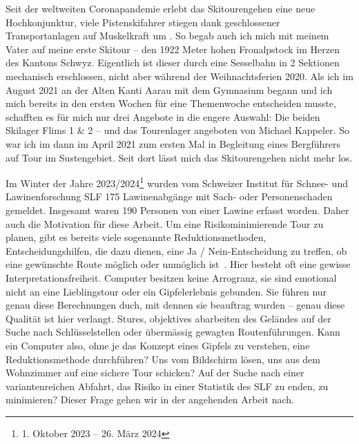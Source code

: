 

Seit der weltweiten Coronapandemie erlebt das Skitourengehen eine neue Hochkonjunktur, viele Pistenskifahrer stiegen dank geschlossener Transportanlagen auf Muskelkraft um \cite{sacCoronaTrend}. So begab auch ich mich mit meinem Vater auf meine erste Skitour – den 1922 Meter hohen Fronalpstock im Herzen des Kantons Schwyz. Eigentlich ist dieser durch eine Sesselbahn in 2 Sektionen mechanisch erschlossen, nicht aber während der Weihnachtsferien 2020.
Als ich im August 2021 an der Alten Kanti Aarau mit dem Gymnasium begann und ich mich bereits in den ersten Wochen für eine Themenwoche entscheiden musste, schafften es für mich nur drei Angebote in die engere Auswahl: Die beiden Skilager Flims 1 \& 2 – und das Tourenlager angeboten von Michael Kappeler. So war ich im dann im April 2021 zum ersten Mal in Begleitung eines Bergführers auf Tour im Sustengebiet. Seit dort lässt mich das Skitourengehen nicht mehr los.

Im Winter der Jahre 2023/2024\footnote{1. Oktober 2023 -- 26. März 2024} wurden vom Schweizer Institut für Schnee- und Lawinenforschung SLF 175 Lawinenabgänge mit Sach- oder Personenschaden gemeldet. Insgesamt waren 190 Personen von einer Lawine erfasst worden.
\cite{slfWinterbericht202324}
\vfill\null
\columnbreak
Daher auch die Motivation für diese Arbeit. Um eine Risikominimierende Tour zu planen, gibt es bereits viele sogenannte Reduktionsmethoden, Entscheidungshilfen, die dazu dienen, eine Ja / Nein-Entscheidung zu treffen, ob eine gewünschte Route möglich oder unmöglich ist~\cite{skitourenguruReduktionsmethoden}.
Hier besteht oft eine gewisse Interpretationsfreiheit. Computer besitzen keine Arrogranz, sie sind emotional nicht an eine Lieblingstour oder ein Gipfelerlebnis gebunden. Sie führen nur genau diese Berechnungen duch, mit dennen sie beauftrag wurden – genau diese Qualität ist hier verlangt. Stures, objektives abarbeiten des Geländes auf der Suche nach Schlüsselstellen oder übermässig gewagten Routenführungen. Kann ein Computer also, ohne je das Konzept eines Gipfels zu verstehen, eine Reduktionsmethode durchführen? Uns vom Bildschirm lösen, uns aus dem Wohnzimmer auf eine sichere Tour schicken? 
Auf der Suche nach einer variantenreichen Abfahrt, das Risiko in einer Statistik des SLF zu enden, zu minimieren?
Dieser Frage gehen wir in der angehenden Arbeit nach.